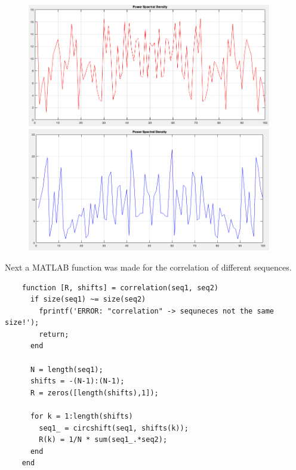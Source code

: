 \documentclass[12pt]{article}
\begin{document}
    \begin{figure}[H]
      \centering
      \begin{minipage}{0.5\textwidth}
        \centering
        \includegraphics[width=0.95\textwidth]{seq1_psd.png}
      \end{minipage}%
      \begin{minipage}{0.5\textwidth}
        \centering
        \includegraphics[width=0.95\textwidth]{seq2_psd.png}
      \end{minipage}
    \end{figure}

    \vspace{10pt}
    Next a MATLAB function was made for the correlation of different sequences.

    \begin{lstlisting}
    function [R, shifts] = correlation(seq1, seq2)
      if size(seq1) ~= size(seq2)
        fprintf('ERROR: "correlation" -> sequneces not the same size!');
        return;
      end

      N = length(seq1);
      shifts = -(N-1):(N-1);
      R = zeros([length(shifts),1]);

      for k = 1:length(shifts)
        seq1_ = circshift(seq1, shifts(k));
        R(k) = 1/N * sum(seq1_.*seq2);
      end
    end
    \end{lstlisting}
\end{document}
